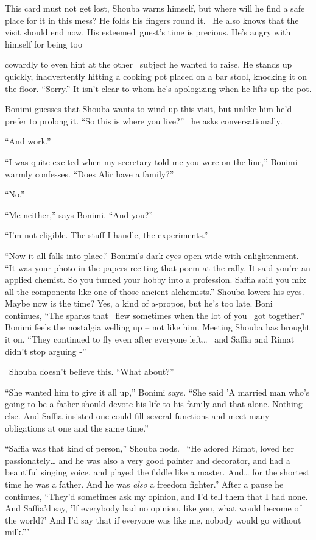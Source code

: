 \documentclass[twoside,11pt]{book}
\begin{document}
This card must not get lost, Shouba warns himself, but where will he find a safe place for it in this mess? He folds his
fingers round it. \ He also knows that the visit should end now. His esteemed~guest's time is precious.
He's{ }angry with himself for being too

cowardly to even hint at the other \ subject he wanted to raise. He stands up quickly, inadvertently hitting a cooking
pot placed on a bar stool, knocking it on the floor. ``Sorry.'' It isn't clear to whom he's
apologizing when he lifts up the pot.

Bonimi guesses that Shouba wants to wind up this visit, but unlike him he'd prefer to prolong it. ``So this
is where you live?'' \ he asks conversationally.

``And work.''

``I was quite excited when my secretary told me you were on the line,'' Bonimi warmly
confesses. ``Does Alir have a family?''

``No.''

``Me neither,'' says Bonimi. ``And you?''

``I'm not eligible. The stuff I handle, the experiments.''

``Now it all falls into place.'' Bonimi's dark eyes open wide with enlightenment.
``It was your photo in the papers reciting that poem at the rally. It said you're an applied chemist. So
you turned your hobby into a profession. Saffia said you mix all the components like one of those ancient
alchemists.'' Shouba lowers his eyes. Maybe now is the time? Yes, a kind of a-propos, but he's too late.
Boni continues, ``The sparks that \ flew sometimes when the lot of you \ got together.''
Bonimi feels the nostalgia welling up -- not like him. Meeting Shouba has brought it on. ``They continued
to fly even after everyone left{\dots} \ and Saffia and Rimat didn't stop arguing -''

~Shouba doesn't believe this. ``What about?''

``She wanted {him} to give it all up,'' Bonimi says. ``She said
'A married man who's going to be a father should devote his life to his family and that alone. Nothing else. And Saffia
insisted one could fill several functions and meet many obligations at one and the same time.''

``Saffia was that kind of person,'' Shouba nods. \ ``He adored Rimat, loved her
passionately{\dots} and he was also a very good painter and decorator, and had a beautiful singing voice, and played
the fiddle like a master. And{\dots} for the shortest time he was a father. And he was \textit{also} a freedom
fighter.'' After a pause he continues, ``They'd sometimes ask my opinion, and I'd tell them
that I had none. And Saffia'd say, 'If everybody had no opinion, like you, what would become of the world?' And I'd say
that if everyone was like me, nobody would go without milk.'''
\end{document}
